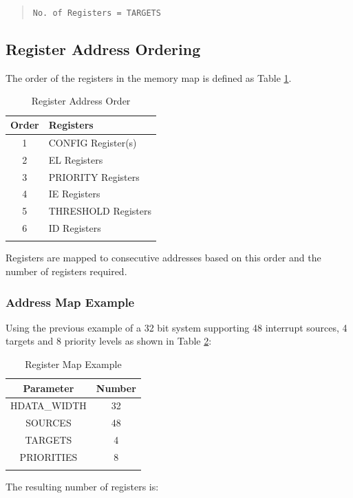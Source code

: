 \begin{quote}
\texttt{No.\ of\ Registers\ =\ TARGETS}
\end{quote}

\subsection{Register Address Ordering}

The order of the registers in the memory map is defined as Table \ref{tab:REGMAP}.

\begin{longtable}[]{@{}cl@{}}	
	\toprule 
	\textbf{Order} & \textbf{Registers}\\
	\midrule
	\endhead 
	1 & CONFIG Register(s)\\
	2 & EL Registers\\
	3 & PRIORITY Registers\\
	4 & IE Registers\\
	5 & THRESHOLD Registers\\
	6 & ID Registers\\
	\bottomrule 	
	\caption{Register Address Order}
	\label{tab:REGMAP}
\end{longtable}

Registers are mapped to consecutive addresses based on this order and the
number of registers required.  

\subsubsection{Address Map Example}

Using the previous example of a 32 bit system supporting 48 interrupt sources, 4 targets and 8 priority levels as shown in Table \ref{tab:REGMAPEX}:

\begin{longtable}[c]{@{}cc@{}}	
		\toprule 
		\textbf{Parameter} & \textbf{Number}\\
		\midrule 
		\endhead
		HDATA\_WIDTH & 32\\
		SOURCES & 48\\
		TARGETS & 4\\
		PRIORITIES & 8\\
		\bottomrule 	
 
	\caption{Register Map Example}
	\label{tab:REGMAPEX}
\end{longtable}

The resulting number of registers is:

